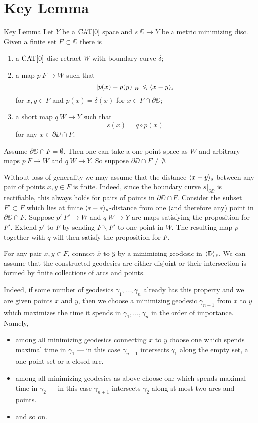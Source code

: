 \section{Key Lemma}\label{Key Lemma}


\begin{thm}{Key Lemma}\label{lem:key}
Let $Y$ be a $\mathop{\rm CAT}\nolimits[0]$ space and $s\:\DD\to Y$ 
be a metric minimizing disc.
Given a finite set $F\subset \DD$
there is 
\begin{enumerate}[(1)]
	\item a $\mathop{\rm CAT}\nolimits[0]$ disc retract $W$ with boundary curve $\delta$;
	\item a map $p\:F\to W$ such that
\[|p(x)-p(y)|_W\leqslant \langle x-y\rangle_s\] 
for $x,y\in F$ and $p(x)=\delta(x)$ for $x\in F\cap \partial\DD$;
  \item a short map $q\:W\to Y$ such that
\[s(x)=q\circ p(x)\] 
for any $x\in\partial\DD\cap F$.
\end{enumerate}
 
\end{thm} 

 Assume $\partial \DD\cap F= \emptyset$.
Then one can take a one-point space as $W$ and arbitrary maps $p\:F\to W$ and $q\:W\to Y$.
So suppose $\partial \DD\cap F\ne\emptyset$.

Without loss of generality we may assume that the distance $\langle x-y\rangle_s$
between any pair of points $x,y\in F$ is finite.
Indeed, since the boundary curve $s|_{\partial\DD}$ is rectifiable,
this always holds for pairs of points in $\partial \DD\cap F$.
Consider the subset $F'\subset F$ which lies at finite $\langle{*}-{*}\rangle_s$-distance from one (and therefore any) point in $\partial \DD\cap F$.
Suppose $p'\:F'\to W$ and $q\:W\to Y$ are maps satisfying the proposition for $F'$.
Extend $p'$ to $F$ by sending $F\backslash F'$ to one point in $W$. The resulting
map $p$ together with $q$ will then satisfy the proposition for $F$.

For any pair $x,y\in F$, connect $\hat x$ to $\hat y$ by a minimizing geodesic in $\langle\mathbb{D}\rangle_s$. 
We can assume that the constructed geodesics 
are either disjoint or their intersection is formed by finite collections of arcs and points.

Indeed, if some number of geodesics $\gamma_1,\dots,\gamma_n$ already has this property and we are given points $x$ and $y$, then
we choose a minimizing geodesic $\gamma_{n+1}$ from $x$ to $y$ which maximizes the time it spends in $\gamma_1,\dots,\gamma_n$  
in the order of importance.
Namely, 
\begin{itemize}
\item  among all minimizing geodesics connecting $x$ to $y$
choose one which spends maximal time in $\gamma_1$ --- in this case $\gamma_{n+1}$ intersects $\gamma_1$ along the empty set, 
a one-point set or a closed arc.
\item among all minimizing geodesics as above
choose one which spends maximal time in $\gamma_2$ --- in this case $\gamma_{n+1}$ intersects $\gamma_2$ along at most two arcs and points.
\item and so on.
\end{itemize}

